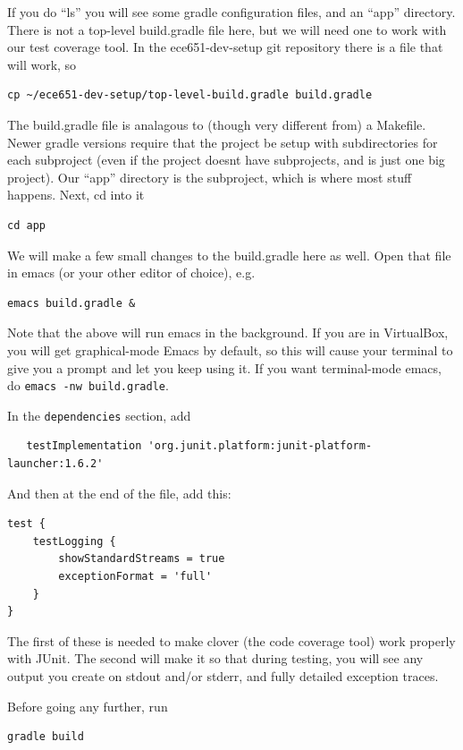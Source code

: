 \documentclass[12pt]{article}
\begin{document}
If you do ``ls'' you will see some gradle configuration files,
and an ``app'' directory.  There is not a top-level build.gradle file
here, but we will need one to work with our test coverage tool.
In the ece651-dev-setup git repository there is a file that will work, so
\begin{verbatim}
cp ~/ece651-dev-setup/top-level-build.gradle build.gradle
\end{verbatim}

The build.gradle file is analagous to (though very different from) a Makefile.
Newer gradle versions require that the project be setup with subdirectories
for each subproject (even if the project doesnt have subprojects, and is just
one big project).   Our ``app'' directory is the subproject, which is where most
stuff happens. Next, cd into it

\begin{verbatim}
cd app
\end{verbatim}

We will make a few small changes to the build.gradle here as well.
Open that file in emacs (or your other editor of choice), e.g.

\begin{verbatim}
emacs build.gradle &
\end{verbatim}
Note that the above will run emacs in the background.  If you are in VirtualBox, you
will get graphical-mode Emacs by default, so this will cause your terminal to give you a prompt
and let you keep using it.  If you want terminal-mode emacs, do \verb+emacs -nw build.gradle+.

In the \verb+dependencies+ section, add
\begin{verbatim}
   testImplementation 'org.junit.platform:junit-platform-launcher:1.6.2'
\end{verbatim} 
And then at the end of the file, add this:
\begin{verbatim}
test {
    testLogging {
        showStandardStreams = true
        exceptionFormat = 'full'
    }
}
\end{verbatim}
The first of these is needed to make clover (the code coverage tool)
work properly with JUnit.  The second will make it so that  during testing,
you will see any output you create on stdout and/or stderr, and
fully detailed exception traces.

Before going any further, run
\begin{verbatim}
gradle build
\end{verbatim}
\end{document}
